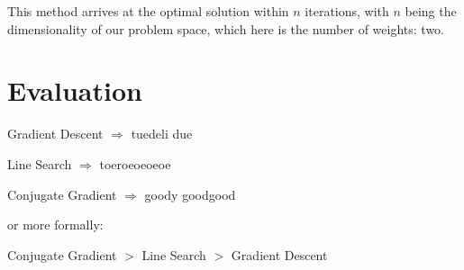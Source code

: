 \documentclass[a4paper,headings=small]{scrartcl}
\numberwithin{equation}{section} %
\numberwithin{figure}{section}   %
\begin{document}
This method arrives at the optimal solution within $n$ iterations,
with $n$ being the dimensionality of our problem space,
which here is the number of weights: two.


\newpage
\section{Evaluation}

\begin{list}{}{}
	\item Gradient Descent $\Rightarrow$ tuedeli due
	\item Line Search $\Rightarrow$ toeroeoeoeoe
	\item Conjugate Gradient $\Rightarrow$ goody goodgood
\end{list}


or more formally:

Conjugate Gradient $>$ Line Search $>$ Gradient Descent
\end{document}
